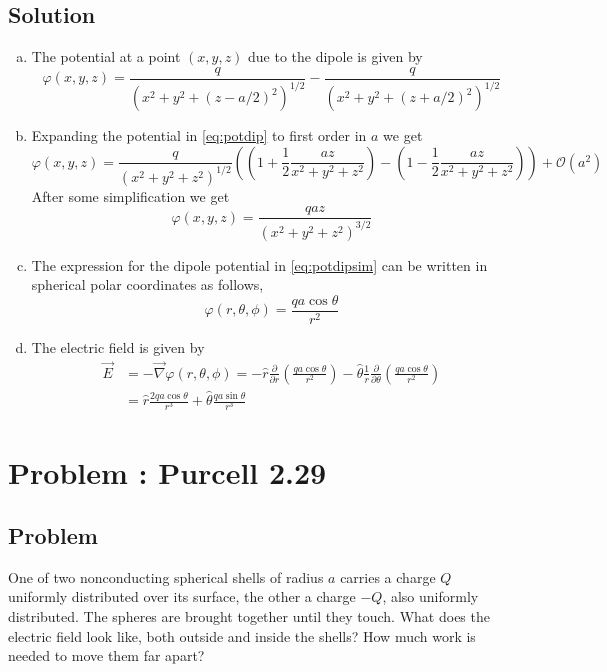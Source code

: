 \documentclass[solutions]{esg8022pset}
\newcommand{\dtheta}{\frac{\partial}{\partial \theta}}
\newcommand{\dr}{\frac{\partial}{\partial r}}
\begin{document}
\subsection{Solution}
  \begin{enumerate}[(a)]
    \item The potential at a point $(x,y,z)$ due to the dipole is given by
      \begin{equation}
        \varphi(x,y,z) = \frac{q}{\left( x^2 + y^2 +(z-a/2)^2 \right)^{1/2}} - \frac{q}{\left( x^2 + y^2 +(z+a/2)^2 \right)^{1/2}} \label{eq:potdip}
      \end{equation}
    \item Expanding the potential in \autoref{eq:potdip} to first order in $a$ we get
      $$\varphi(x,y,z) = \frac{q}{\left( x^2 + y^2 +z^2 \right)^{1/2}}\left( \left( 1+ \frac{1}{2} \frac{az}{x^2 + y^2 + z^2} \right) - \left(1-\frac{1}{2} \frac{az}{x^2 + y^2 + z^2} \right)\right) + \mathcal O(a^2)$$
      After some simplification we get
      \begin{equation}  \varphi(x,y,z) = \frac{q az}{\left( x^2 + y^2 +z^2 \right)^{3/2}} \label{eq:potdipsim}\end{equation}
    \item The expression for the dipole potential in \autoref{eq:potdipsim} can be written in spherical polar coordinates as follows,
      $$\varphi(r,\theta,\phi) = \frac{q a \cos \theta}{r ^2}$$
    \item The electric field is given by
      \begin{align*}
        \vec{E} & = - \vec{\nabla}\varphi(r,\theta,\phi) = - \hat r \dr \left( \frac{qa \cos \theta}{r^2} \right) - \hat\theta \frac{1}{r}\dtheta \left( \frac{qa \cos \theta}{r^2} \right) \\
          & = \hat r\frac{2 qa \cos \theta}{r^3} + \hat\theta \frac{qa \sin \theta}{r^3}
      \end{align*}
  \end{enumerate}
\section{Problem \thesection: Purcell 2.29}
\subsection{Problem}
  One of two nonconducting spherical shells of radius $a$ carries
  a charge $Q$ uniformly distributed over its surface, the other a charge
  $-Q$, also uniformly distributed. The spheres are brought together
  until they touch. What does the electric field look like, both outside
  and inside the shells? How much work is needed to move them far
  apart?
\end{document}
